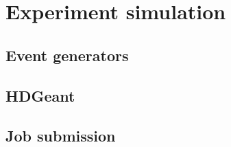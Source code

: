 

\section{Experiment simulation \label{sec:simulation}}
\subsection{Event generators \label{sec:generators}}
\subsection{HDGeant \label{sec:hdgeant}}
\subsection{Job submission \label{sec:jobsubmission}}

